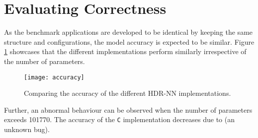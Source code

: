 

\section{Evaluating Correctness}


As the benchmark applications are developed to be identical by keeping the same structure and configurations, the model accuracy is expected to be similar. Figure \ref{hdrnn-accuracy} showcases that the different implementations perform similarly irrespective of the number of parameters.

\begin{figure}[!ht]
	\centering
	\texttt{[image: accuracy]}
	\caption[HDR-NN Accuracy]{Comparing the accuracy of the different HDR-NN implementations.}
	\label{hdrnn-accuracy}
\end{figure}

Further, an abnormal behaviour can be observed when the number of parameters exceeds 101770. The accuracy of the \texttt{C} implementation decreases due to (an unknown bug).




